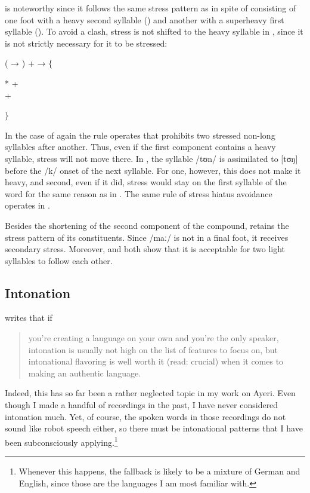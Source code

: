 is noteworthy since it follows the same stress 
pattern as  in spite of consisting of one foot with 
a heavy second syllable () and another with a superheavy 
first syllable (). To avoid a clash, stress is not shifted to 
the heavy syllable in , since it is not strictly necessary 
for it to be stressed:

\ex
	( → ) +  → 
		$\left.\Big\{\right.$\parbox{\widthof{*\fw{depàng} + 
		\fw{cā́ti}}}{* +  \\
		 + }$\left.\Big\}\right.$
\xe

In the case of  again the rule operates that 
prohibits two stressed non-long syllables after another. Thus, even if the 
first component  contains a heavy syllable, stress will not 
move there. In , the syllable /tʊn/ is assimilated
 to [tʊŋ] before the /k/ onset of the 
next syllable. For one, however, this does not make it heavy, and second, even 
if it did, stress would stay on the first syllable of the word for the same 
reason as in . The same rule of stress hiatus 
avoidance operates in .

Besides the shortening of the second component of the compound, 
 retains the stress pattern of its constituents.
Since /maː/ is not in a final foot, it receives secondary stress. Moreover,
 and  both show that 
it is acceptable for two light syllables to follow each other.


\subsection{Intonation}

\citet[66]{peterson2015} writes that if \blockquote{you're creating a language 
on your own and you're the only speaker, intonation is usually not high on the 
list of features to focus on, but intonational flavoring is well worth it 
(read: crucial) when it comes to making an authentic language.} Indeed, this 
has so far been a rather neglected topic in my work on Ayeri. Even though I 
made a handful of recordings in the past, I have never considered intonation 
much. Yet, of course, the spoken words in those recordings do not sound like 
robot speech either, so there must be intonational patterns that I have been 
subconsciously applying.\footnote{Whenever this happens, the fallback is 
likely to be a mixture of German and English, since those are the languages I 
am most familiar with.}

